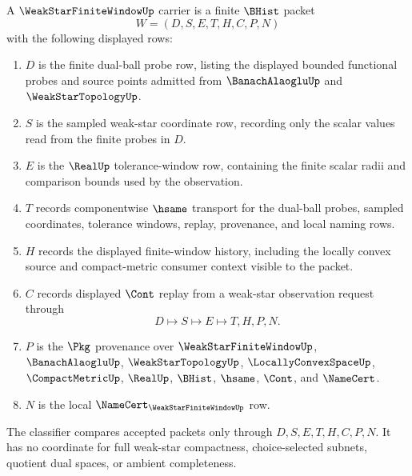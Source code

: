 \begin{definition}
\label{def:weak-star-finite-window-carrier}
A $\WeakStarFiniteWindowUp$ carrier is a finite $\BHist$ packet
$$
W=(D,S,E,T,H,C,P,N)
$$
with the following displayed rows:
\begin{enumerate}
\item $D$ is the finite dual-ball probe row, listing the displayed bounded functional probes and source points admitted from $\BanachAlaogluUp$ and $\WeakStarTopologyUp$.
\item $S$ is the sampled weak-star coordinate row, recording only the scalar values read from the finite probes in $D$.
\item $E$ is the $\RealUp$ tolerance-window row, containing the finite scalar radii and comparison bounds used by the observation.
\item $T$ records componentwise $\hsame$ transport for the dual-ball probes, sampled coordinates, tolerance windows, replay, provenance, and local naming rows.
\item $H$ records the displayed finite-window history, including the locally convex source and compact-metric consumer context visible to the packet.
\item $C$ records displayed $\Cont$ replay from a weak-star observation request through
$$
D \longmapsto S \longmapsto E \longmapsto T,H,P,N .
$$
\item $P$ is the $\Pkg$ provenance over $\WeakStarFiniteWindowUp$, $\BanachAlaogluUp$, $\WeakStarTopologyUp$, $\LocallyConvexSpaceUp$, $\CompactMetricUp$, $\RealUp$, $\BHist$, $\hsame$, $\Cont$, and $\NameCert$.
\item $N$ is the local $\NameCert_{\WeakStarFiniteWindowUp}$ row.
\end{enumerate}
The classifier compares accepted packets only through $D,S,E,T,H,C,P,N$. It has no coordinate for full weak-star compactness, choice-selected subnets, quotient dual spaces, or ambient completeness.
\end{definition}

